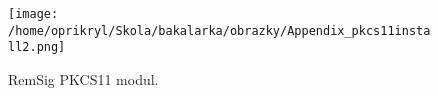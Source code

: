 \documentclass[]{fithesis3}
\begin{document}
		\begin{figure}[!ht]
  			\begin{minipage}{1.00\textwidth}
    				\texttt{[image: /home/oprikryl/Skola/bakalarka/obrazky/Appendix\_pkcs11install2.png]}
  			\end{minipage}
 			\caption{RemSig PKCS11 modul.}
  			\label{fig:RemSig PKCS11 modul.}
		\end{figure}	
	
\end{document}
